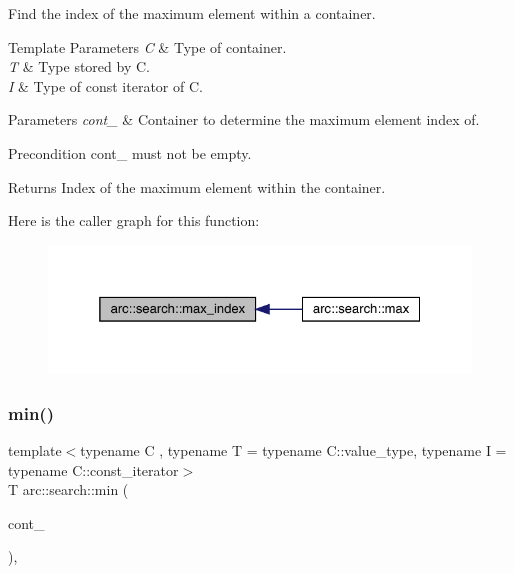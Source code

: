 Find the index of the maximum element within a container.


\begin{DoxyTemplParams}{Template Parameters}
{\em C} & Type of container. \\
\hline
{\em T} & Type stored by C. \\
\hline
{\em I} & Type of const iterator of C.\\
\hline
\end{DoxyTemplParams}

\begin{DoxyParams}{Parameters}
{\em cont\+\_\+} & Container to determine the maximum element index of.\\
\hline
\end{DoxyParams}
\begin{DoxyPrecond}{Precondition}
cont\+\_\+ must not be empty.
\end{DoxyPrecond}
\begin{DoxyReturn}{Returns}
Index of the maximum element within the container. 
\end{DoxyReturn}
Here is the caller graph for this function\+:\nopagebreak
\begin{figure}[H]
\begin{center}
\leavevmode
\includegraphics[width=325pt]{namespacearc_1_1search_aac33af22b716309501eaa7f5a10cc1d0_icgraph}
\end{center}
\end{figure}
\mbox{\label{namespacearc_1_1search_a1cf0173ae1f8475d3b1652c006d5649d}} 
\subsubsection{\texorpdfstring{min()}{min()}}
{\footnotesize\ttfamily template$<$typename C , typename T  = typename C\+::value\+\_\+type, typename I  = typename C\+::const\+\_\+iterator$>$ \\
T arc\+::search\+::min (\begin{DoxyParamCaption}\item[{const C \&}]{cont\+\_\+ }\end{DoxyParamCaption})\hspace{0.3cm}{\ttfamily [inline]}, {\ttfamily [noexcept]}}


